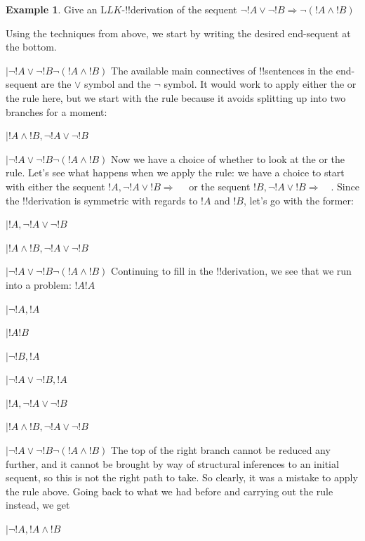 \documentclass[10pt,a4paper]{article}
\theoremstyle{plain}
\theoremstyle{definition}
\newtheorem{ex}[thm]{Example}
\theoremstyle{remark}
\providecommand{\AxiomC}[1]{}
\providecommand{\RightLabel}[1]{}
\providecommand{\fCenter}{}
\newenvironment{prooftree}{}{}
\providecommand{\Sequent}{\mathrel{\Rightarrow}}
\providecommand{\Log}{\ensuremath{\mathrm{L}}}
\providecommand{\LeftR}[1]{}
\providecommand{\RightR}[1]{}
\providecommand{\UnaryInf}{\ensuremath{\mid}}
\providecommand{\BinaryInf}{\ensuremath{\mid}}
\providecommand{\RightR}{\mathrm{R}}
\providecommand{\LeftR}{\mathrm{L}}
\providecommand{\Axiom}{\mathrm{Ax}}
\begin{document}
\begin{ex}
Give an $\Log{LK}$-!!{derivation} of the sequent $\lnot !A \lor \lnot !B
\Sequent \lnot (!A \land !B)$

Using the techniques from above, we start by writing the desired
end-sequent at the bottom.
\begin{prooftree}
\AxiomC{}
\UnaryInf$ \lnot !A \lor \lnot !B \fCenter \lnot (!A \land !B) $
\end{prooftree}
The available main connectives of !!{sentence}s in the end-sequent are
the $\lor$ symbol and the $\lnot$ symbol. It would work to apply
either the \LeftR{\lor} or the \RightR{\lnot} rule here, but we start
with the \RightR{\lnot} rule because it avoids splitting up into two
branches for a moment:
\begin{prooftree}
\AxiomC{}
\UnaryInf$!A \land !B, \lnot !A \lor \lnot !B \fCenter $
\RightLabel{\RightR{\lnot}}
\UnaryInf$\lnot !A \lor \lnot !B \fCenter \lnot (!A \land !B)$
\end{prooftree}
Now we have a choice of whether to look at the \LeftR{\land} or the
\LeftR{\lor} rule. Let's see what happens when we apply the \LeftR{\land}
rule: we have a choice to start with either the sequent $!A,
\lnot !A \lor !B \Sequent \quad$ or the sequent $!B, \lnot !A
\lor !B \Sequent \quad$. Since the !!{derivation} is symmetric with
regards to $!A$ and $!B$, let's go with the former:
\begin{prooftree}
\AxiomC{}
\UnaryInf$!A, \lnot !A \lor \lnot !B \fCenter $
\RightLabel{\LeftR{\land}}
\UnaryInf$!A \land !B, \lnot !A \lor \lnot !B \fCenter $
\RightLabel{\RightR{\lnot}}
\UnaryInf$\lnot !A \lor \lnot !B \fCenter \lnot (!A \land !B)$
\end{prooftree}
Continuing to fill in the !!{derivation}, we see that we run into a problem:
\begin{prooftree}
\Axiom$!A \fCenter !A$
\RightLabel{\LeftR{\lnot}}
\UnaryInf$ \lnot !A, !A \fCenter$
\AxiomC{}
\RightLabel{?}
\UnaryInf$!A \fCenter !B$
\RightLabel{\LeftR{\lnot}}
\UnaryInf$ \lnot !B, !A \fCenter$
\RightLabel{\LeftR{\lor}}
\BinaryInf$\lnot !A \lor \lnot !B, !A \fCenter $
\RightLabel{\LeftR{\Exchange}}
\UnaryInf$!A, \lnot !A \lor \lnot !B \fCenter $
\RightLabel{\LeftR{\land}}
\UnaryInf$!A \land !B, \lnot !A \lor \lnot !B \fCenter $
\RightLabel{\RightR{\lnot}}
\UnaryInf$\lnot !A \lor \lnot !B \fCenter \lnot (!A \land !B)$
\end{prooftree}
The top of the right branch cannot be reduced any further, and it
cannot be brought by way of structural inferences to an initial
sequent, so this is not the right path to take. So clearly, it was a
mistake to apply the \LeftR{\land} rule above. Going back to what we
had before and carrying out the \LeftR{\lor} rule instead, we get
\begin{prooftree}
\AxiomC{}
\UnaryInf$\lnot !A, !A \land !B \fCenter $


\end{prooftree}
\end{ex}
\end{document}
